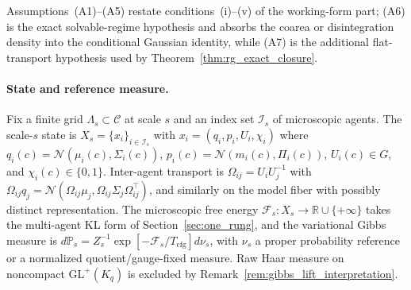 \documentclass[11pt]{article}
\begin{document}
Assumptions~(A1)--(A5) restate conditions~(i)--(v) of the working-form part; (A6) is the exact solvable-regime hypothesis and absorbs the coarea or disintegration density into the conditional Gaussian identity, while (A7) is the additional flat-transport hypothesis used by Theorem~\ref{thm:rg_exact_closure}.

\paragraph{State and reference measure.}
Fix a finite grid $\Lambda_s \subset \mathcal{C}$ at scale $s$ and an index set $\mathcal{I}_s$ of microscopic agents. The scale-$s$ state is $X_s = \{x_i\}_{i \in \mathcal{I}_s}$ with $x_i = (q_i, p_i, U_i, \chi_i)$ where $q_i(c) = \mathcal{N}(\mu_i(c), \Sigma_i(c))$, $p_i(c) = \mathcal{N}(m_i(c), \Pi_i(c))$, $U_i(c) \in G$, and $\chi_i(c) \in \{0, 1\}$. Inter-agent transport is $\Omega_{ij} = U_i U_j^{-1}$ with $\Omega_{ij} q_j = \mathcal{N}(\Omega_{ij}\mu_j, \Omega_{ij}\Sigma_j\Omega_{ij}^\top)$, and similarly on the model fiber with possibly distinct representation. The microscopic free energy $\mathcal{F}_s : X_s \to \mathbb{R} \cup \{+\infty\}$ takes the multi-agent KL form of Section~\ref{sec:one_rung}, and the variational Gibbs measure is $d\mathbb{P}_s = Z_s^{-1}\exp[-\mathcal{F}_s/T_{\mathrm{cfg}}]d\nu_s$, with $\nu_s$ a proper probability reference or a normalized quotient/gauge-fixed measure. Raw Haar measure on noncompact $\mathrm{GL}^+(K_q)$ is excluded by Remark~\ref{rem:gibbs_lift_interpretation}.
\end{document}
